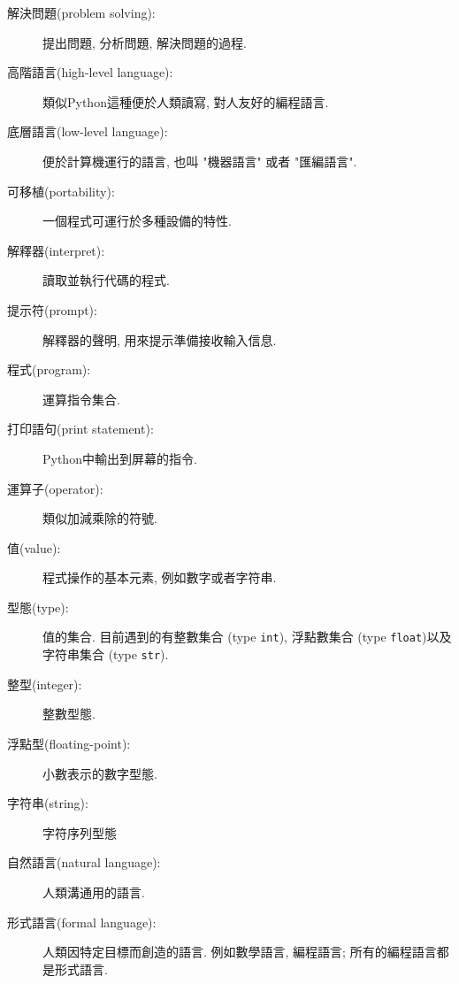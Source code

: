 \documentclass[10pt]{book}
\begin{document}
\begin{description}

\item[解決問題(problem solving):] 提出問題, 分析問題, 解決問題的過程. 

\item[高階語言(high-level language):] 類似Python這種便於人類讀寫, 對人友好的編程語言. 

\item[底層語言(low-level language):] 便於計算機運行的語言, 也叫 "機器語言" 或者 "匯編語言".

\item[可移植(portability):] 一個程式可運行於多種設備的特性. 

\item[解釋器(interpret):] 讀取並執行代碼的程式. 

\item[提示符(prompt):] 解釋器的聲明, 用來提示準備接收輸入信息. 

\item[程式(program):] 運算指令集合. 

\item[打印語句(print statement):] Python中輸出到屏幕的指令. 

\item[運算子(operator):] 類似加減乘除的符號. 

\item[值(value):] 程式操作的基本元素, 例如數字或者字符串. 

\item[型態(type):] 值的集合. 目前遇到的有整數集合 (type {\tt int}), 
浮點數集合 (type {\tt float})以及字符串集合 (type {\tt str}).

\item[整型(integer):] 整數型態. 

\item[浮點型(floating-point):] 小數表示的數字型態. 

\item[字符串(string):] 字符序列型態

\item[自然語言(natural language):] 人類溝通用的語言. 

\item[形式語言(formal language):] 人類因特定目標而創造的語言. 
例如數學語言, 編程語言; 所有的編程語言都是形式語言. 


\end{description}
\end{document}
